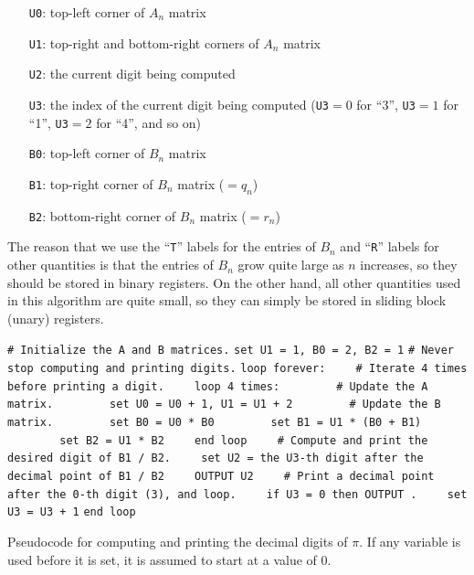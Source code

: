 \begin{itemize}
	\item[\texttt{U0}:] top-left corner of $A_n$ matrix
	
	\item[\texttt{U1}:] top-right and bottom-right corners of $A_n$ matrix
	
	\item[\texttt{U2}:] the current digit being computed
	
	\item[\texttt{U3}:] the index of the current digit being computed (\texttt{U3}${} = 0$ for ``3'', \texttt{U3}${} = 1$ for ``1'', \texttt{U3}${} = 2$ for ``4'', and so on)\smallskip
	
	\item[\texttt{B0}:] top-left corner of $B_n$ matrix
	
	\item[\texttt{B1}:] top-right corner of $B_n$ matrix ($= q_n$)
	
	\item[\texttt{B2}:] bottom-right corner of $B_n$ matrix ($= r_n$)\smallskip
\end{itemize}

The reason that we use the ``\texttt{T}'' labels for the entries of $B_n$ and ``\texttt{R}'' labels for other quantities is that the entries of $B_n$ grow quite large as $n$ increases, so they should be stored in binary registers. On the other hand, all other quantities used in this algorithm are quite small, so they can simply be stored in sliding block (unary) registers.

\begin{pseudocode}
	\begin{algorithmic}[1]\small
		\State\texttt{\# Initialize the A and B matrices.}
		\State\texttt{set U1 = 1, B0 = 2, B2 = 1}
		\Statex
		\State\texttt{\# Never stop computing and printing digits.}
		\State\texttt{loop forever:}
		\State\texttt{~~~~\# Iterate 4 times before printing a digit.}
		\State\texttt{~~~~loop 4 times:}
		\State\texttt{~~~~~~~~\# Update the A matrix.}
		\State\texttt{~~~~~~~~set U0 = U0 + 1,  U1 = U1 + 2}
		\Statex
		\State\texttt{~~~~~~~~\# Update the B matrix.}
		\State\texttt{~~~~~~~~set B0 = U0 * B0}
		\State\texttt{~~~~~~~~set B1 = U1 * (B0 + B1)}
		\State\texttt{~~~~~~~~set B2 = U1 * B2}
		\State\texttt{~~~~end loop}
		\Statex
		\State\texttt{~~~~\# Compute and print the desired digit of B1 / B2.}
		\State\texttt{~~~~set U2 = the U3-th digit after the decimal point of B1 / B2}
		\State\texttt{~~~~OUTPUT U2}
		\Statex
		\State\texttt{~~~~\# Print a decimal point after the 0-th digit (3), and loop.}
		\State\texttt{~~~~if U3 = 0 then OUTPUT .}
		\State\texttt{~~~~set U3 = U3 + 1}
		\State\texttt{end loop}
	\end{algorithmic}
	\caption{Pseudocode for computing and printing the decimal digits of $\pi$. If any variable is used before it is set, it is assumed to start at a value of $0$.}\label{alg:pseudocode_pi_calc}
\end{pseudocode}


